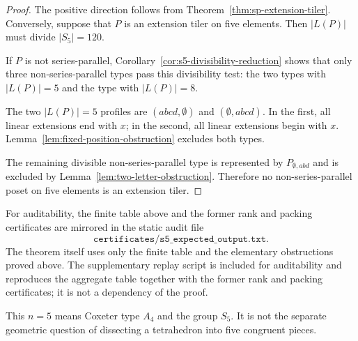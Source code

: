 \begin{proof}
The positive direction follows from Theorem~\ref{thm:sp-extension-tiler}.
Conversely, suppose that $P$ is an extension tiler on five elements.  Then
$|L(P)|$ must divide $|S_5|=120$.

If $P$ is not series-parallel, Corollary~\ref{cor:s5-divisibility-reduction}
shows that only three non-series-parallel types pass this divisibility
test: the two types with $|L(P)|=5$ and the type with $|L(P)|=8$.

The two $|L(P)|=5$ profiles are $(abcd,\emptyset)$ and
$(\emptyset,abcd)$.  In the first, all linear extensions end with $x$; in
the second, all linear extensions begin with $x$.  Lemma~\ref{lem:fixed-position-obstruction}
excludes both types.

The remaining divisible non-series-parallel type is represented by
$P_{\emptyset,abd}$ and is excluded by
Lemma~\ref{lem:two-letter-obstruction}.  Therefore no non-series-parallel
poset on five elements is an extension tiler.
\end{proof}

For auditability, the finite table above and the former rank and packing
certificates are mirrored in the static audit file
\[
\texttt{certificates/s5\_expected\_output.txt}.
\]
The theorem itself uses only the finite table and the elementary
obstructions proved above.  The supplementary replay script is included
for auditability and reproduces the aggregate table together with the
former rank and packing certificates; it is not a dependency of the proof.

\begin{remark}
This $n=5$ means Coxeter type $A_4$ and the group $S_5$.  It is not the
separate geometric question of dissecting a tetrahedron into five
congruent pieces.
\end{remark}
